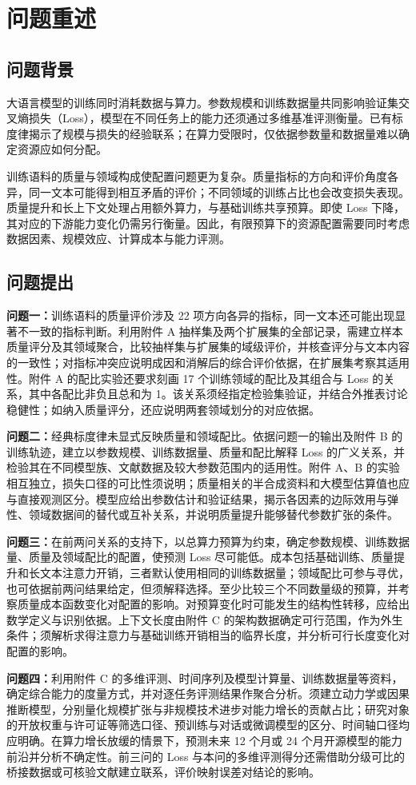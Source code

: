 \section{问题重述}

\subsection{问题背景}

大语言模型的训练同时消耗数据与算力。参数规模和训练数据量共同影响验证集交叉熵损失（Loss），模型在不同任务上的能力还须通过多维基准评测衡量。已有标度律揭示了规模与损失的经验联系；在算力受限时，仅依据参数量和数据量难以确定资源应如何分配。

训练语料的质量与领域构成使配置问题更为复杂。质量指标的方向和评价角度各异，同一文本可能得到相互矛盾的评价；不同领域的训练占比也会改变损失表现。质量提升和长上下文处理占用额外算力，与基础训练共享预算。即使 Loss 下降，其对应的下游能力变化仍需另行衡量。因此，有限预算下的资源配置需要同时考虑数据因素、规模效应、计算成本与能力评测。

\subsection{问题提出}

\noindent\textbf{问题一：}训练语料的质量评价涉及 22 项方向各异的指标，同一文本还可能出现显著不一致的指标判断。利用附件 A 抽样集及两个扩展集的全部记录，需建立样本质量评分及其领域聚合，比较抽样集与扩展集的域级评价，并核查评分与文本内容的一致性；对指标冲突应说明成因和消解后的综合评价依据，在扩展集考察其适用性。附件 A 的配比实验还要求刻画 17 个训练领域的配比及其组合与 Loss 的关系，其中各配比非负且总和为 1。该关系须经指定检验集验证，并结合外推表讨论稳健性；如纳入质量评分，还应说明两套领域划分的对应依据。

\noindent\textbf{问题二：}经典标度律未显式反映质量和领域配比。依据问题一的输出及附件 B 的训练轨迹，建立以参数规模、训练数据量、质量和配比解释 Loss 的广义关系，并检验其在不同模型族、文献数据及较大参数范围内的适用性。附件 A、B 的实验相互独立，损失口径的可比性须说明；质量相关的半合成资料和大模型估算值也应与直接观测区分。模型应给出参数估计和验证结果，揭示各因素的边际效用与弹性、领域数据间的替代或互补关系，并说明质量提升能够替代参数扩张的条件。

\noindent\textbf{问题三：}在前两问关系的支持下，以总算力预算为约束，确定参数规模、训练数据量、质量及领域配比的配置，使预测 Loss 尽可能低。成本包括基础训练、质量提升和长文本注意力开销，三者默认使用相同的训练数据量；领域配比可参与寻优，也可依据前两问结果给定，但须解释选择。至少比较三个不同数量级的预算，并考察质量成本函数变化对配置的影响。对预算变化时可能发生的结构性转移，应给出数学定义与识别依据。上下文长度由附件 C 的架构数据确定可行范围，作为外生条件；须解析求得注意力与基础训练开销相当的临界长度，并分析可行长度变化对配置的影响。

\noindent\textbf{问题四：}利用附件 C 的多维评测、时间序列及模型计算量、训练数据量等资料，确定综合能力的度量方式，并对逐任务评测结果作聚合分析。须建立动力学或因果推断模型，分别量化规模扩张与非规模技术进步对能力增长的贡献占比；研究对象的开放权重与许可证等筛选口径、预训练与对话或微调模型的区分、时间轴口径均应明确。在算力增长放缓的情景下，预测未来 12 个月或 24 个月开源模型的能力前沿并分析不确定性。前三问的 Loss 与本问的多维评测得分还需借助分级可比的桥接数据或可核验文献建立联系，评价映射误差对结论的影响。
